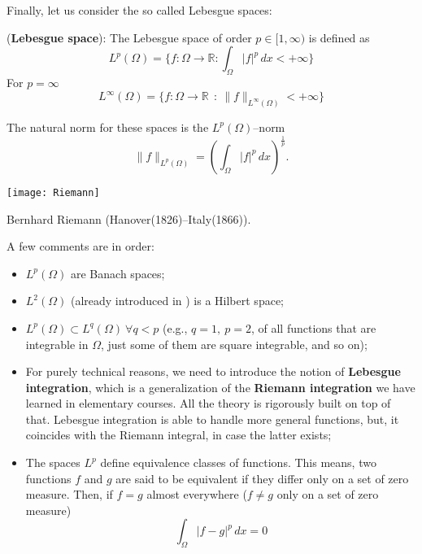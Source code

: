 Finally, let us consider the so called Lebesgue spaces:
\begin{definition} 
(\textbf{Lebesgue space}):
The Lebesgue space of order $p \in [1,\infty)$ is defined as
\begin{equation}
L^p(\Omega) = \{ f: \Omega \rightarrow \mathbb{R} : \int_{\Omega}{|f|^p}\,dx < +\infty \}
\end{equation}
For $p = \infty$
\begin{equation}
L^{\infty}(\Omega) = \{ f: \Omega \rightarrow \mathbb{R}~~:~\lVert f \rVert_{L^{\infty}(\Omega)} < +\infty \}
\end{equation}
\end{definition}
The natural norm for these spaces is the $L^{p}(\Omega)$--norm
\begin{equation}
\lVert f \rVert_{L^p(\Omega)} = \left ( \int_{\Omega}{|f|^p}\,dx \right )^{\frac{1}{p}}.
\end{equation}
\begin{marginfigure}[-2.0cm]
       \texttt{[image: Riemann]}
       \caption[]{Bernhard Riemann (Hanover(1826)--Italy(1866)).} 
\end{marginfigure}
A few comments are in order:
\begin{itemize}
\item $L^p(\Omega)$ are Banach spaces;\\
\item $L^2(\Omega)$ (already introduced in ) is a Hilbert space;\\
\item $L^p(\Omega) \subset L^q(\Omega)~\forall q < p$ (e.g., $q=1,~p=2$,
of all functions that are integrable in $\Omega$, just some of them are
square integrable, and so on);\\
\item For purely technical reasons, we need to 
introduce the notion of \textbf{Lebesgue integration},
which is a generalization of the \textbf{Riemann integration} we
have learned in elementary courses. All the theory is rigorously built on top
of that. Lebesgue integration is able to handle more general functions, but,
it coincides with the Riemann integral, in case
the latter exists;\\
\item The spaces $L^p$ define equivalence classes of functions.
This means, two functions $f$ and $g$ are said to be equivalent if they differ only
on a set of zero measure.
Then, if $f = g$ almost everywhere
($f\ne g$ only on a set of zero measure)
\begin{equation}
\int_{\Omega}{|f-g|^p}\,dx = 0
\end{equation}
\end{itemize}

